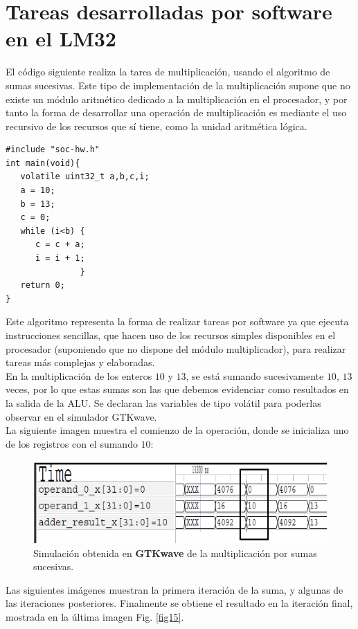 \documentclass[twocolumn]{IEEEtran}
\begin{document}
\section{Tareas desarrolladas por software en el LM32}\label{sumas}
\noindent
El código siguiente realiza la tarea de multiplicación, usando el algoritmo de sumas sucesivas. Este tipo de implementación de la multiplicación supone que no existe un módulo aritmético dedicado a la  multiplicación en el procesador, y por tanto la forma de desarrollar una operación de multiplicación es mediante el uso recursivo de los recursos que sí tiene, como la unidad aritmética lógica.
\lstset{numbers=left, numberstyle=\tiny, stepnumber=1, numbersep=1pt}
\begin{lstlisting}[firstnumber=7, caption=Codigo inicial, label=code1]
#include "soc-hw.h"
int main(void){
   volatile uint32_t a,b,c,i;
   a = 10;
   b = 13;
   c = 0;
   while (i<b) {
      c = c + a;
      i = i + 1;
               }
   return 0;
}
\end{lstlisting}
\noindent
Este algoritmo representa la forma de realizar tareas por software ya que ejecuta instrucciones sencillas, que hacen uso de los recursos simples disponibles en el procesador (suponiendo que no dispone del módulo multiplicador), para realizar tareas más complejas y elaboradas.\\
En la multiplicación de los enteros $10$ y $13$, se está sumando sucesivamente $10$, $13$ veces, por lo que estas sumas son las que debemos evidenciar como resultados en la salida de la ALU. Se declaran las variables de tipo volátil para poderlas observar en el simulador GTKwave.\\
La siguiente imagen muestra el comienzo de la operación, donde se inicializa uno de los registros con el sumando $10$:
\begin{figure}[H]
	\centering
		\includegraphics[scale=0.5]{01.png}
	\caption{Simulación obtenida en \textbf{GTKwave} de la multiplicación por sumas sucesivas.}
	\label{fig1}
\end{figure}
\noindent
Las siguientes imágenes muestran la primera iteración de la suma, y algunas de las iteraciones posteriores. Finalmente se obtiene el resultado en la iteración final, mostrada en la última imagen Fig. \ref{fig15}.\\
\end{document}

